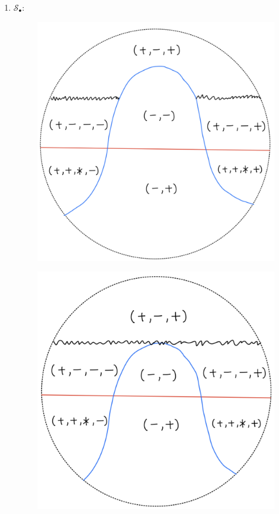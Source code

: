 \begin{definition}
\begin{enumerate}
\item $\mathcal{S}_\bullet$:
\begin{itemize}
\begin{figure}[H]
    \centering
    \includegraphics[scale = 0.95]{diagrams/lemma2/7.png} 
    \caption{}
    \label{fig:your-label}
\end{figure}
\begin{figure}[H]
    \centering
    \includegraphics[scale = 0.95]{diagrams/lemma2/8.png} 

\end{figure}
\end{itemize}
\end{enumerate}
\end{definition}
